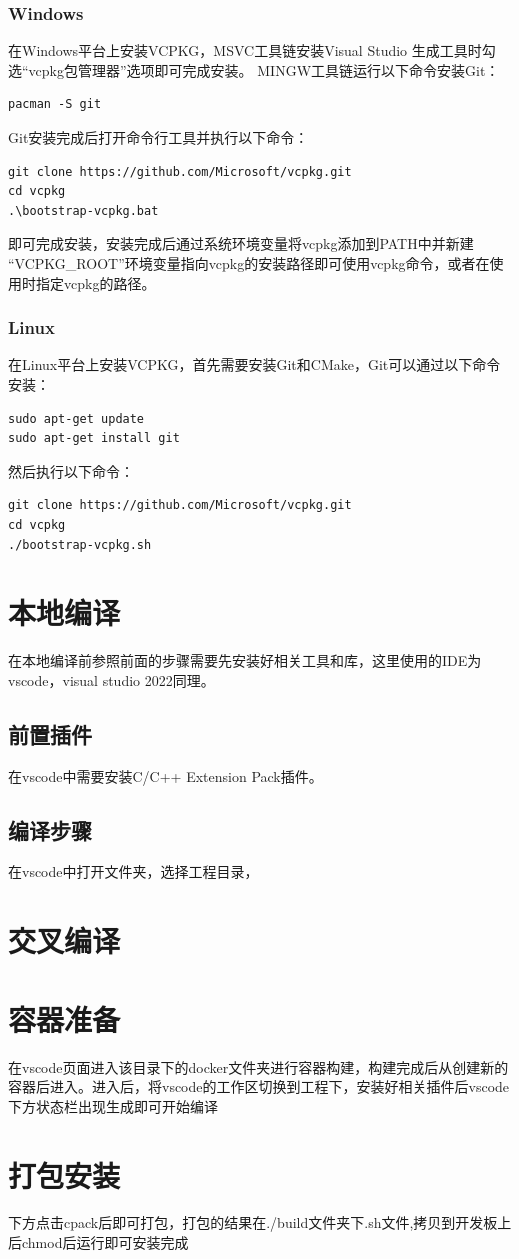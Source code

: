 \documentclass{easybook}
\begin{document}
\subsubsection{Windows}
在Windows平台上安装VCPKG，MSVC工具链安装Visual Studio 生成工具时勾选“vcpkg包管理器”选项即可完成安装。
MINGW工具链运行以下命令安装Git：

\begin{lstlisting}
pacman -S git
\end{lstlisting}
Git安装完成后打开命令行工具并执行以下命令：

\begin{lstlisting}
git clone https://github.com/Microsoft/vcpkg.git
cd vcpkg
.\bootstrap-vcpkg.bat
\end{lstlisting}
即可完成安装，安装完成后通过系统环境变量将vcpkg添加到PATH中并新建
“VCPKG\_ROOT”环境变量指向vcpkg的安装路径即可使用vcpkg命令，或者在使用时指定vcpkg的路径。

\subsubsection{Linux}
在Linux平台上安装VCPKG，首先需要安装Git和CMake，Git可以通过以下命令安装：
\begin{lstlisting}
sudo apt-get update
sudo apt-get install git
\end{lstlisting}
然后执行以下命令：
\begin{lstlisting}
git clone https://github.com/Microsoft/vcpkg.git
cd vcpkg
./bootstrap-vcpkg.sh
\end{lstlisting}
\section{本地编译}
在本地编译前参照前面的步骤需要先安装好相关工具和库，这里使用的IDE为vscode，visual studio 2022同理。
\subsection{前置插件}
在vscode中需要安装C/C++ Extension Pack插件。
\subsection{编译步骤}
在vscode中打开文件夹，选择工程目录，

\section{交叉编译}
\section{容器准备}
在vscode页面进入该目录下的docker文件夹进行容器构建，构建完成后从创建新的容器后进入。进入后，将vscode的工作区切换到工程下，安装好相关插件后vscode下方状态栏出现生成即可开始编译
\section{打包安装}
下方点击cpack后即可打包，打包的结果在./build文件夹下.sh文件,拷贝到开发板上后chmod后运行即可安装完成
\end{document}
